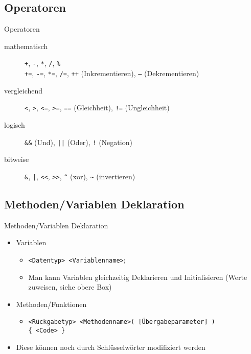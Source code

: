 \subsection{Operatoren}
\begin{frame}{Operatoren}
	\begin{description}
	    \item[mathematisch] \alert{\texttt{+}}, \alert{\texttt{-}}, \alert{\texttt{*}}, \alert{\texttt{/}}, 						\alert{\texttt{\%}}\\
	    \alert{\texttt{+=}}, \alert{\texttt{-=}}, \alert{\texttt{*=}}, \alert{\texttt{/=}}, \alert{\texttt{++}} (Inkrementieren), \alert{\texttt{--}} (Dekrementieren)
	    \item[vergleichend] \alert{\texttt{<}}, \alert{\texttt{>}}, \alert{\texttt{<=}}, \alert{\texttt{>=}}, \alert{\texttt{==}} (Gleichheit), \alert{\texttt{!=}} (Ungleichheit)
	    \item[logisch] \alert{\texttt{\&\&}} (Und), \alert{\texttt{||}} (Oder), \alert{\texttt{!}} (Negation)
	    \item[bitweise] \alert{\texttt{\&}}, \alert{\texttt{|}}, \alert{\texttt{<<}}, \alert{\texttt{>>}}, \alert{\texttt{\^}} (xor), \alert{\texttt{\~}} (invertieren)
	\end{description}
\end{frame}

\subsection{Methoden/Variablen Deklaration}
\begin{frame}{Methoden/Variablen Deklaration}
	\begin{itemize}
		\item Variablen
		
		\begin{itemize}
			\item \alert{\texttt{<Datentyp> <Variablenname>};}
			\item Man kann Variablen gleichzeitig Deklarieren und Initialisieren (Werte zuweisen, siehe obere Box)
		\end{itemize}
		\item Methoden/Funktionen		
		
		\begin{itemize}			
			\item \texttt{\alert{<Rückgabetyp> <Methodenname>}( \alert{[Übergabeparameter]} ) \\ \{ \alert{<Code>} \}}
		\end{itemize}
		\item Diese können noch durch Schlüsselwörter modifiziert werden
	\end{itemize}
\end{frame}


